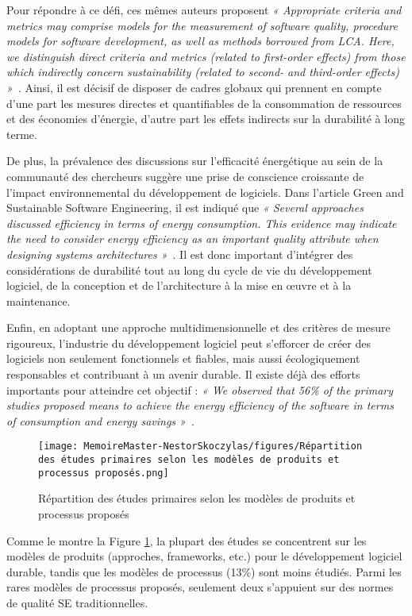 Pour répondre à ce défi, ces mêmes auteurs proposent \emph{« Appropriate criteria and metrics may comprise models for the measurement of software quality, procedure models for software development, as well as methods borrowed from LCA. Here, we distinguish direct criteria and metrics (related to first-order effects) from those which indirectly concern sustainability (related to second- and third-order effects) »}~\cite{GreenSoftModel}. Ainsi, il est décisif de disposer de cadres globaux qui prennent en compte d'une part les mesures directes et quantifiables de la consommation de ressources et des économies d'énergie, d'autre part les effets indirects sur la durabilité à long terme.


De plus, la prévalence des discussions sur l'efficacité énergétique au sein de la communauté des chercheurs suggère une prise de conscience croissante de l'impact environnemental du développement de logiciels. Dans l'article Green and Sustainable Software Engineering, il est indiqué que \emph{« Several approaches discussed efficiency in terms of energy consumption. This evidence may indicate the need to consider energy efficiency as an important quality attribute when designing systems architectures »}~\cite{GreenSustainableEngMapping}. Il est donc important d'intégrer des considérations de durabilité tout au long du cycle de vie du développement logiciel, de la conception et de l'architecture à la mise en œuvre et à la maintenance.


Enfin, en adoptant une approche multidimensionnelle et des critères de mesure rigoureux, l'industrie du développement logiciel peut s'efforcer de créer des logiciels non seulement fonctionnels et fiables, mais aussi écologiquement responsables et contribuant à un avenir durable. Il existe déjà des efforts importants pour atteindre cet objectif : \emph{« We observed that 56\% of the primary studies proposed means to achieve the energy efficiency of the software in terms of consumption and energy savings »}~\cite{GreenSustainableEngMapping}.

\begin{figure}[H]
    \centering
    \texttt{[image: MemoireMaster-NestorSkoczylas/figures/Répartition des études primaires selon les modèles de produits et processus proposés.png]}
    \caption{Répartition des études primaires selon les modèles de produits et processus proposés}
    \label{fig:repartition-etudes-primaires}
\end{figure}

Comme le montre la Figure \ref{fig:repartition-etudes-primaires}, la plupart des études se concentrent sur les modèles de produits (approches, frameworks, etc.) pour le développement logiciel durable, tandis que les modèles de processus (13\%) sont moins étudiés. Parmi les rares modèles de processus proposés, seulement deux s'appuient sur des normes de qualité SE traditionnelles.

